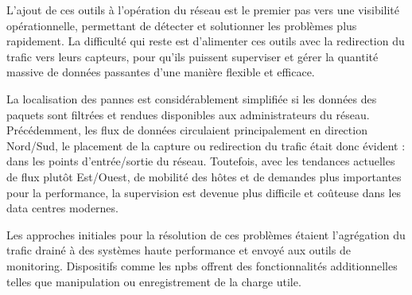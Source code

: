 L'ajout de ces outils à l'opération du réseau est le premier pas vers une visibilité opérationnelle, permettant de détecter et solutionner les problèmes plus rapidement. La difficulté qui reste est d'alimenter ces outils avec la redirection du trafic vers leurs capteurs, pour qu'ils puissent superviser et gérer la quantité massive de données passantes d'une manière flexible et efficace. 

La localisation des pannes est considérablement simplifiée si les données des paquets sont filtrées et rendues disponibles aux administrateurs du réseau. Précédemment, les flux de données circulaient principalement en direction Nord/Sud, le placement de la capture ou redirection du trafic était donc évident : dans les points d'entrée/sortie du réseau. Toutefois, avec les tendances actuelles de flux plutôt Est/Ouest, de mobilité des hôtes et de demandes plus importantes pour la performance, la supervision est devenue plus difficile et coûteuse dans les data centres modernes.

Les approches initiales pour la résolution de ces problèmes étaient l'agrégation du trafic drainé à des systèmes haute performance et envoyé aux outils de monitoring. Dispositifs comme les \glspl{npb} offrent des fonctionnalités additionnelles telles que manipulation ou enregistrement de la charge utile. 

